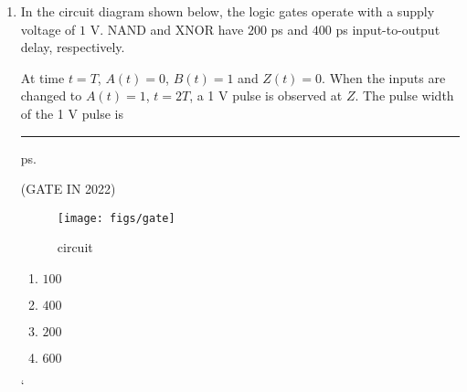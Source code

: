 \begin{enumerate}
\item In the circuit diagram shown below, the logic gates operate with a supply voltage of $1$ V. NAND and XNOR have $200$ ps and $400$ ps input-to-output delay,
respectively.

At time $t = T$, $A(t) = 0 $, $B(t) = 1$ and $Z(t) = 0$. When the inputs are changed to $A(t) = 1$, $t = 2T$, a 1 V pulse is observed at $Z$. The pulse width of the 1 V pulse is \rule{30pt}{1pt} ps.


\hfill{(GATE IN 2022)}

  \begin{figure}[!ht]
	  \texttt{[image: figs/gate]}
         \caption{circuit}
   \label{figs:fig1}
  \end{figure}

\begin{enumerate}
\item $ 100 $
\item $ 400 $
\item $ 200 $ 
\item $ 600 $
\end{enumerate}`
\end{enumerate}
